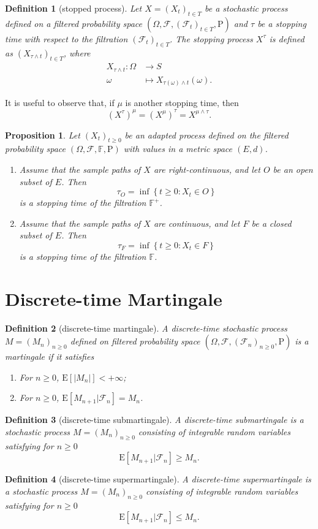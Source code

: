 \documentclass{report}
\newtheorem{definition}{Definition}[section]
\newtheorem{proposition}{Proposition}[section]
\theoremstyle{nonumberplain}
\begin{document}
\begin{definition}[stopped process]
	Let $X=(X_{t})_{t\in T}$ be a stochastic process defined on a filtered probability space $(\Omega,\mathcal{F},(\mathcal{F}_{t})_{t\in T},\mathrm{P})$ and $\tau$ be a stopping time with respect to the filtration $(\mathcal{F}_{t})_{t\in T}$. The stopping process $X^\tau$ is defined as $(X_{\tau \wedge t})_{t\in T}$, where
	\begin{align*}
	X_{\tau \wedge t}:\Omega&\longrightarrow S\\
	\omega&\longmapsto X_{\tau(\omega) \wedge t}(\omega).
	\end{align*}
\end{definition}
It is useful to observe that, if $\mu$ is another stopping time, then
\[
(X^\tau)^\mu=(X^\mu)^\tau=X^{\mu\wedge\tau}.
\]
\begin{proposition}
	Let $\left(X_{t}\right)_{t \geq 0}$ be an adapted process defined on the filtered probability space $(\Omega,\mathcal{F},\mathbb{F},\mathrm{P})$ with values in a metric space $(E, d)$.
	\begin{enumerate}  
		\item Assume that the sample paths of $X$ are right-continuous, and let $O$ be an open subset of $E$. Then
		\[
		\tau_{O}=\inf \left\{t \geq 0: X_{t} \in O\right\}
		\]
		is a stopping time of the filtration $\mathbb{F}^+$.
		\item Assume that the sample paths of $X$ are continuous, and let $F$ be a closed subset
		of $E$. Then
		\[
		\tau_{F}=\inf \left\{t \geq 0: X_{t} \in F\right\}
		\]
		is a stopping time of the filtration $\mathbb{F}$.
	\end{enumerate}
\end{proposition}


\section{Discrete-time Martingale}
\begin{definition}[discrete-time martingale]
	A discrete-time stochastic process $M=(M_n)_{n\ge 0}$ defined on filtered probability space $(\Omega,\mathcal{F},(\mathcal{F}_{n})_{n\ge0},\mathrm{P})$ is a \emph{martingale} if it satisfies
	\begin{enumerate}
		\item For $n\ge0$, $\mathrm{E}[|M_n|]<+\infty$;
		\item For $n\ge0$, $\mathrm{E}[M_{n+1}|\mathcal{F}_n]=M_n$.
	\end{enumerate}
\end{definition}
\begin{definition}[discrete-time submartingale]
A discrete-time \emph{submartingale} is a stochastic process $M=(M_n)_{n\ge 0}$ consisting of integrable random variables satisfying for $n\ge0$
\[
\mathrm{E}[M_{n+1}|\mathcal{F}_n]\ge M_n.
\]
\end{definition}
\begin{definition}[discrete-time supermartingale]
	A discrete-time \emph{supermartingale} is a stochastic process $M=(M_n)_{n\ge 0}$ consisting of integrable random variables satisfying for $n\ge0$
	\[
	\mathrm{E}[M_{n+1}|\mathcal{F}_n]\le M_n.
	\]
\end{definition}
\end{document}
